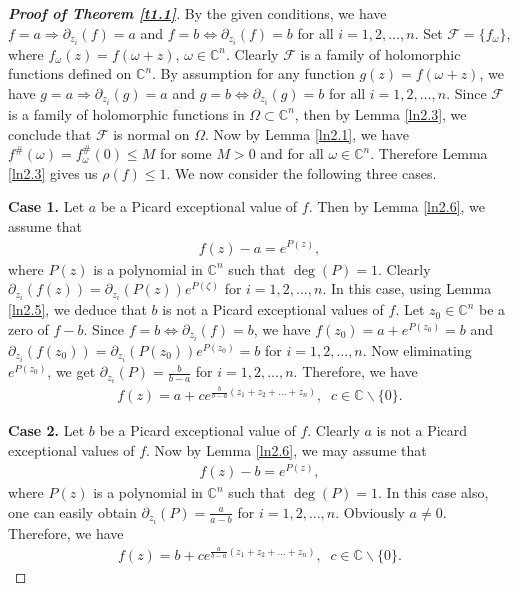 \documentclass[11pt, reqno]{amsart}
\newtheorem*{cor A}{Corollary A}
\newtheorem*{cor B}{Corollary B}
\numberwithin{equation}{section}
\begin{document}
\begin{proof}[{\bf Proof of Theorem \ref{t1.1}}] 
By the given conditions, we have $f=a\Rightarrow \partial_{z_i}(f)=a$ and $f=b\Leftrightarrow \partial_{z_i}(f)=b$ for all $i=1,2,\ldots,n$.  Set $\mathcal{F}=\{f_{\omega}\}$, where $f_{\omega}(z)=f(\omega+z)$, $\omega\in\mathbb{C}^n$. Clearly $\mathcal{F}$ is a family of holomorphic functions defined on $\mathbb{C}^n$. By assumption for any function $g(z)=f(\omega+z)$, we have $g=a\Rightarrow \partial_{z_i}(g)=a$ and $g=b\Leftrightarrow  \partial_{z_i}(g)=b$ for all $i=1,2,\ldots,n$. Since $\mathcal{F}$ is a family of holomorphic functions in $\Omega\subset\mathbb{C}^n$, then by Lemma \ref{ln2.3}, we conclude that $\mathcal{F}$ is normal on $\Omega$. 
Now by Lemma \ref{ln2.1}, we have $f^{\#}(\omega)=f^{\#}_{\omega}(0)\leq M$ for some $M>0$ and for all $\omega\in\mathbb{C}^n$. Therefore Lemma \ref{ln2.3} gives us $\rho(f)\leq 1$. 
We now consider the following three cases.

\smallskip
{\bf Case 1.} Let $a$ be a Picard exceptional value of $f$. Then by Lemma \ref{ln2.6}, we assume that
\begin{align*}
f(z)-a=e^{P(z)},
\end{align*}
where $P(z)$ is a polynomial in $\mathbb{C}^n$ such that $\deg(P)=1$. Clearly $\partial_{z_i}(f(z))=\partial_{z_i}(P(z))e^{P(\zeta)}$ for $i=1,2,\ldots,n$. In this case, using Lemma \ref{ln2.5}, we deduce that $b$ is not a Picard exceptional values of $f$. Let $z_0\in\mathbb{C}^n$ be a zero of $f-b$. Since $f=b\Leftrightarrow \partial_{z_i}(f)=b$, we have $f(z_0)=a+e^{P(z_0)}=b$ and $\partial_{z_i}(f(z_0))=\partial_{z_i}(P(z_0))e^{P(z_0)}=b$ for $i=1,2,\ldots,n$. Now eliminating $e^{P(z_0)}$, we get $\partial_{z_i}(P)=\frac{b}{b-a}$ for $i=1,2,\ldots,n$. Therefore, we have 
\begin{align*}
f(z)=a+ce^{\frac{b}{b-a}(z_1+z_2+\ldots+z_n)},\;\;c\in\mathbb{C}\backslash \{0\}.
\end{align*}


\smallskip
{\bf Case 2.} Let $b$ be a Picard exceptional value of $f$. Clearly $a$ is not a Picard exceptional values of $f$. Now by Lemma \ref{ln2.6}, we may assume that
\begin{align*}
f(z)-b=e^{P(z)},
\end{align*}
where $P(z)$ is a polynomial in $\mathbb{C}^n$ such that $\deg(P)=1$. In this case also, one can easily obtain $\partial_{z_i}(P)=\frac{a}{a-b}$ for $i=1,2,\ldots,n$. Obviously $a\neq 0$. Therefore, we have 
\begin{align*}
f(z)=b+ce^{\frac{a}{b-a}(z_1+z_2+\ldots+z_n)},\;\;c\in\mathbb{C}\backslash \{0\}.
\end{align*}




\end{proof}
\end{document}
